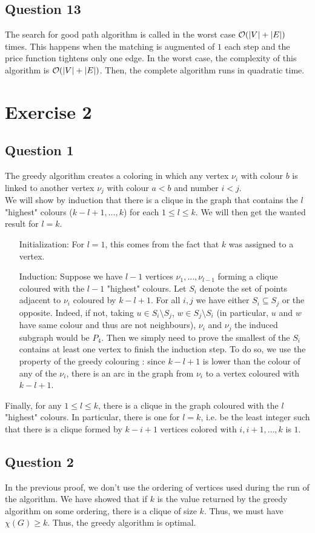 \documentclass{cours}
\begin{document}
\subsection{Question 13}
The search for good path algorithm is called in the worst case $\mathcal{O}(\left|V\right| + \left|E\right|)$ times. This happens when the matching is augmented of $1$ each step and the price function tightens only one edge. In the worst case, the complexity of this algorithm is $\mathcal{O}(\left|V\right| + \left|E\right|)$. Then, the complete algorithm runs in quadratic time. 
\newpage
\section{Exercise 2}
\subsection{Question 1}
The greedy algorithm creates a coloring in which any vertex $\nu_{i}$ with colour $b$ is linked to another vertex $\nu_{j}$ with colour $a < b$ and number $i < j$. \\
We will show by induction that there is a clique in the graph that contains the $l$ "highest" colours ($k - l + 1, \ldots, k$) for each $1 \leq l \leq k$. We will then get the wanted result for $l = k$.
\begin{itemize}
    \item[Initialization:] For $l = 1$, this comes from the fact that $k$ was assigned to a vertex. 
    \item[Induction:] Suppose we have $l - 1$ vertices $\nu_{1}, \ldots, \nu_{l - 1}$ forming a clique coloured with the $l - 1$ "highest" colours. Let $S_{i}$ denote the set of points adjacent to $\nu_{i}$ coloured by $k - l + 1$. For all $i, j$ we have either $S_{i} \subseteq S_{j}$ or the opposite. Indeed, if not, taking $u \in S_{i} \setminus S_{j}$, $w \in S_{j} \setminus S_{i}$ (in particular, $u$ and $w$ have same colour and thus are not neighbours), $\nu_{i}$ and $\nu_{j}$ the induced subgraph would be $P_{4}$. Then we simply need to prove the smallest of the $S_{i}$ contains at least one vertex to finish the induction step. To do so, we use the property of the greedy colouring : since $k - l + 1$ is lower than the colour of any of the $\nu_{i}$, there is an arc in the graph from $\nu_{i}$ to a vertex coloured with $k - l + 1$. 
\end{itemize} 
Finally, for any $1 \leq l \leq k$, there is a clique in the graph coloured with the $l$ "highest" colours. In particular, there is one for $l = k$, i.e. be the least integer such that there is a clique formed by $k - i + 1$ vertices colored with $i, i + 1, \ldots, k$ is $1$. 

\subsection{Question 2}
In the previous proof, we don't use the ordering of vertices used during the run of the algorithm. We have showed that if $k$ is the value returned by the greedy algorithm on some ordering, there is a clique of size $k$. Thus, we must have $\chi(G) \geq k$. Thus, the greedy algorithm is optimal. 
\end{document}
